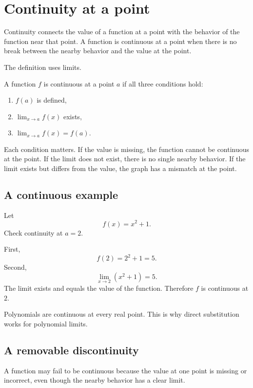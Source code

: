 \section{Continuity at a point}

Continuity connects the value of a function at a point with the behavior of the function near that point. A function is continuous at a point when there is no break between the nearby behavior and the value at the point.

The definition uses limits.

\begin{definitionbox}
A function \(f\) is continuous at a point \(a\) if all three conditions hold:
\begin{enumerate}
\item \(f(a)\) is defined,
\item \(\displaystyle \lim_{x\to a}f(x)\) exists,
\item \(\displaystyle \lim_{x\to a}f(x)=f(a)\).
\end{enumerate}
\end{definitionbox}

Each condition matters. If the value is missing, the function cannot be continuous at the point. If the limit does not exist, there is no single nearby behavior. If the limit exists but differs from the value, the graph has a mismatch at the point.

\subsection*{A continuous example}

\begin{examplebox}
Let
\[
f(x)=x^2+1.
\]
Check continuity at \(a=2\).

First,
\[
f(2)=2^2+1=5.
\]
Second,
\[
\lim_{x\to2}(x^2+1)=5.
\]
The limit exists and equals the value of the function. Therefore \(f\) is continuous at \(2\).
\end{examplebox}

Polynomials are continuous at every real point. This is why direct substitution works for polynomial limits.

\subsection*{A removable discontinuity}

A function may fail to be continuous because the value at one point is missing or incorrect, even though the nearby behavior has a clear limit.

